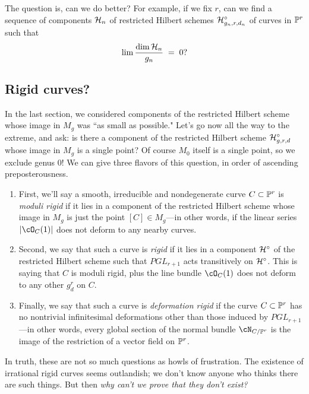 The question is, can we do better? For example, if we fix $r$, can we find a sequence of components $\cH_n$ of  restricted Hilbert schemes  $\cH^\circ_{g_n,r,d_n}$ of curves in $\PP^r$ such that
$$
\lim \frac{\dim \cH_n}{g_n} \; = \; 0?
$$

\subsection{Rigid curves?}

In the last section, we considered components of the restricted Hilbert scheme whose image in $M_g$ was ``as small as possible." Let's go now all the way to the extreme, and ask: is there a component of the restricted Hilbert scheme $\cH^\circ_{g,r,d}$ whose image in $M_g$ is a single point? Of course $M_0$ itself is a single point, so we exclude genus 0! We can give three flavors of this question, in order of ascending preposterousness.

\begin{enumerate} 
\item First, we'll say a smooth, irreducible and nondegenerate curve $C \subset \PP^r$ is \emph{moduli rigid} if it lies in a component of the restricted Hilbert scheme whose image in $M_g$ is just the point $[C] \in M_g$---in other words, if the linear series $|\cO_C(1)|$ does not deform to any nearby curves.

\item Second, we say that such a curve is \emph{rigid} if it lies in a component $\cH^\circ$ of the restricted Hilbert scheme such that $PGL_{r+1}$ acts transitively on $\cH^\circ$. This is saying that $C$ is moduli rigid, plus the line bundle $\cO_C(1)$ does not deform to any other $g^r_d$ on $C$.

\item Finally, we say that such a curve is \emph{deformation rigid} if the curve $C \subset \PP^r$ has no nontrivial infinitesimal deformations other than those induced by $PGL_{r+1}$---in other words, every global section of the normal bundle $\cN_{C/\PP^r}$ is the image of the restriction of a vector field on $\PP^r$.
\end{enumerate}

In truth, these are not so much questions as howls of frustration. The existence of irrational rigid curves seems outlandish; we don't know anyone who thinks there are such things. But then \emph{why can't we prove that they don't exist?} 


